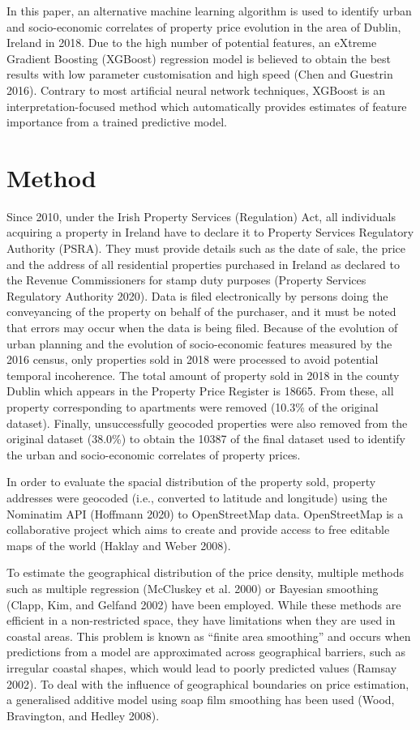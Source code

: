 \documentclass[conference,final,]{IEEEtran}
\begin{document}
In this paper, an alternative machine learning algorithm is used to identify urban and socio-economic correlates of property price evolution in the area of Dublin, Ireland in 2018. Due to the high number of potential features, an eXtreme Gradient Boosting (XGBoost) regression model is believed to obtain the best results with low parameter customisation and high speed (Chen and Guestrin 2016). Contrary to most artificial neural network techniques, XGBoost is an interpretation-focused method which automatically provides estimates of feature importance from a trained predictive model.

\hypertarget{method}{%
\section{Method}\label{method}}

Since 2010, under the Irish Property Services (Regulation) Act, all individuals acquiring a property in Ireland have to declare it to Property Services Regulatory Authority (PSRA). They must provide details such as the date of sale, the price and the address of all residential properties purchased in Ireland as declared to the Revenue Commissioners for stamp duty purposes (Property Services Regulatory Authority 2020). Data is filed electronically by persons doing the conveyancing of the property on behalf of the purchaser, and it must be noted that errors may occur when the data is being filed.
Because of the evolution of urban planning and the evolution of socio-economic features measured by the 2016 census, only properties sold in 2018 were processed to avoid potential temporal incoherence. The total amount of property sold in 2018 in the county Dublin which appears in the Property Price Register is 18665. From these, all property corresponding to apartments were removed (10.3\% of the original dataset). Finally, unsuccessfully geocoded properties were also removed from the original dataset (38.0\%) to obtain the 10387 of the final dataset used to identify the urban and socio-economic correlates of property prices.

In order to evaluate the spacial distribution of the property sold, property addresses were geocoded (i.e., converted to latitude and longitude) using the Nominatim API (Hoffmann 2020) to OpenStreetMap data. OpenStreetMap is a collaborative project which aims to create and provide access to free editable maps of the world (Haklay and Weber 2008).

To estimate the geographical distribution of the price density, multiple methods such as multiple regression (McCluskey et al. 2000) or Bayesian smoothing (Clapp, Kim, and Gelfand 2002) have been employed. While these methods are efficient in a non-restricted space, they have limitations when they are used in coastal areas. This problem is known as ``finite area smoothing'' and occurs when predictions from a model are approximated across geographical barriers, such as irregular coastal shapes, which would lead to poorly predicted values (Ramsay 2002). To deal with the influence of geographical boundaries on price estimation, a generalised additive model using soap film smoothing has been used (Wood, Bravington, and Hedley 2008).
\end{document}
